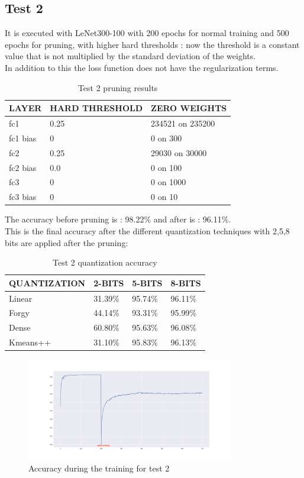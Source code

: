 \documentclass[journal]{vgtc}                %
\begin{document}
\subsection{Test 2}
It is executed with LeNet300-100 with 200 epochs for normal training and 500 epochs for pruning, with higher hard thresholds : now the threshold is a constant value that is not multiplied by the standard deviation of the weights.\\In addition to this the loss function does not have the regularization terms.
\begin{table}[H]
\caption{Test 2 pruning results}
\label{my-label}
\begin{tabular}{|l|l|l|}
\hline
LAYER    & HARD THRESHOLD & ZERO WEIGHTS     \\ \hline
fc1      & 0.25         & 234521 on 235200 \\ \hline
fc1 bias & 0     & 0 on 300        \\ \hline
fc2      & 0.25          & 29030 on 30000   \\ \hline
fc2 bias & 0.0      & 0 on 100       \\ \hline
fc3      & 0       & 0 on 1000      \\ \hline
fc3 bias & 0         & 0 on 10          \\ \hline
\end{tabular}
\end{table}
The accuracy before pruning is : 98.22\% and after is : 96.11\%.\\This is the final accuracy after the different quantization techniques with 2,5,8 bits are applied after the pruning:
\begin{table}[H]
\caption{Test 2 quantization accuracy}
\label{my-label}
\begin{tabular}{|l|l|l|l|}
\hline
QUANTIZATION & 2-BITS  & 5-BITS  & 8-BITS  \\ \hline
Linear       & 31.39\% & 95.74\% & 96.11\% \\ \hline
Forgy        & 44.14\% & 93.31\% & 95.99\% \\ \hline
Dense        & 60.80\% & 95.63\% & 96.08\% \\ \hline
Kmeans++     & 31.10\% & 95.83\% & 96.13\% \\ \hline
\end{tabular}
\end{table}\begin{figure}[H]
	\includegraphics[width=90mm,scale=0.7]{accuracy-hard-threshold}
	\caption{Accuracy during the training for test 2}
\end{figure}
\end{document}
